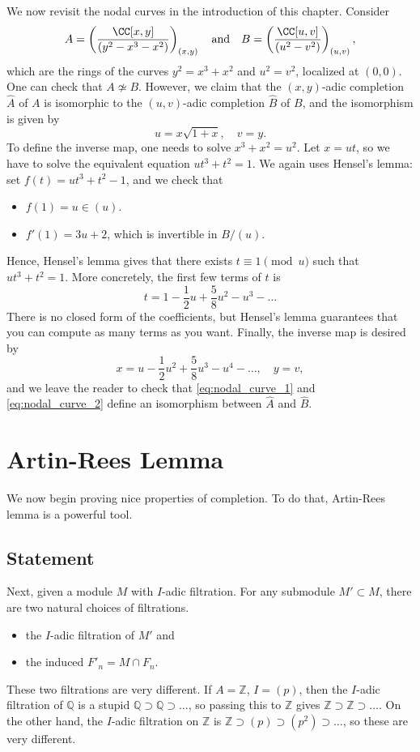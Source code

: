 We now revisit the nodal curves in the introduction
of this chapter. Consider
$$A = \left(\frac{\CC[x,y]}{(y^2-x^3-x^2)}\right)_{(x,y)}
\quad\text{and}\quad 
B = \left(\frac{\CC[u,v]}{(u^2-v^2)}\right)_{(u,v)},$$
which are the rings of the curves $y^2=x^3+x^2$
and $u^2=v^2$, localized at $(0,0)$.
One can check that $A\not\simeq B$.
However, we claim that the $(x,y)$-adic completion
$\widehat A$ of $A$ is isomorphic to the 
$(u,v)$-adic completion $\widehat B$ of $B$,
and the isomorphism is given by
\begin{equation}
\label{eq:nodal_curve_1}
u=x\sqrt{1+x},\quad v=y.
\end{equation}
To define the inverse map, one needs to solve $x^3+x^2=u^2$. 
Let $x=ut$, so we have to solve the equivalent equation
$ut^3 + t^2 = 1$.
We again uses Hensel's lemma: set $f(t) = ut^3+t^2-1$,
and we check that
\begin{itemize}
    \item $f(1) = u\in (u)$.
    \item $f'(1) = 3u+2$, which is invertible in $B/(u)$.
\end{itemize}
Hence, Hensel's lemma gives that there exists
$t\equiv 1\pmod u$ such that $ut^3+t^2=1$.
More concretely, the first few terms of $t$ is
$$t = 1 - \frac 12 u + \frac 58 u^2 - u^3 - \dots$$
There is no closed form of the coefficients, but Hensel's lemma
guarantees that you can compute as many terms as you want.
Finally, the inverse map is desired by
\begin{equation}
\label{eq:nodal_curve_2}
x = u - \frac 12 u^2 + \frac 58 u^3 - u^4 - \dots,\quad y=v,
\end{equation}
and we leave the reader to check that 
\eqref{eq:nodal_curve_1} and \eqref{eq:nodal_curve_2}
define an isomorphism between $\widehat A$ and $\widehat B$.

%
%
%
%
\section{Artin-Rees Lemma}
We now begin proving nice properties of completion.
To do that, Artin-Rees lemma is a powerful tool.
\subsection{Statement}
Next, given a module $M$ with $I$-adic filtration.
For any submodule $M'\subset M$, there are two natural
choices of filtrations.
\begin{itemize}
    \item the $I$-adic filtration of $M'$ and
    \item the induced 
	$F'_n = M\cap F_n$.
\end{itemize}
These two filtrations are very different.
If $A=\mathbb Z$, $I=(p)$,
then the $I$-adic filtration of $\mathbb Q$
is a stupid $\mathbb Q\supset\mathbb Q\supset\dots$,
so passing this to $\mathbb Z$ gives $\mathbb Z\supset\mathbb Z
\supset\dots$.
On the other hand, the $I$-adic filtration on $\mathbb Z$
is $\mathbb Z\supset (p)\supset (p^2)\supset\dots$,
so these are very different.

